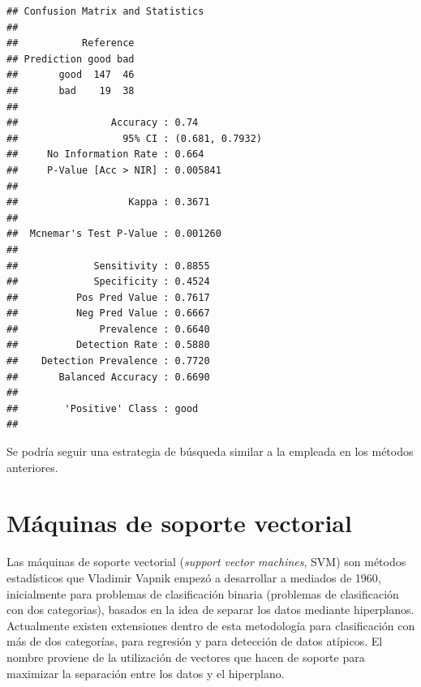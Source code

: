 \documentclass[
]{book}
\newenvironment{Shaded}{\begin{snugshade}}{\end{snugshade}}
\newcommand{\AttributeTok}[1]{\textcolor[rgb]{0.77,0.63,0.00}{#1}}
\newcommand{\FunctionTok}[1]{\textcolor[rgb]{0.00,0.00,0.00}{#1}}
\newcommand{\NormalTok}[1]{#1}
\newcommand{\SpecialCharTok}[1]{\textcolor[rgb]{0.00,0.00,0.00}{#1}}
\theoremstyle{break}
\theoremstyle{definition}
\theoremstyle{definition}
\theoremstyle{definition}
\theoremstyle{definition}
\theoremstyle{remark}
\begin{document}
\begin{Shaded}
\end{Shaded}

\begin{verbatim}
## Confusion Matrix and Statistics
## 
##           Reference
## Prediction good bad
##       good  147  46
##       bad    19  38
##                                          
##                Accuracy : 0.74           
##                  95% CI : (0.681, 0.7932)
##     No Information Rate : 0.664          
##     P-Value [Acc > NIR] : 0.005841       
##                                          
##                   Kappa : 0.3671         
##                                          
##  Mcnemar's Test P-Value : 0.001260       
##                                          
##             Sensitivity : 0.8855         
##             Specificity : 0.4524         
##          Pos Pred Value : 0.7617         
##          Neg Pred Value : 0.6667         
##              Prevalence : 0.6640         
##          Detection Rate : 0.5880         
##    Detection Prevalence : 0.7720         
##       Balanced Accuracy : 0.6690         
##                                          
##        'Positive' Class : good           
## 
\end{verbatim}

Se podría seguir una estrategia de búsqueda similar a la empleada en los métodos anteriores.

\hypertarget{svm}{%
\chapter{Máquinas de soporte vectorial}\label{svm}}

Las máquinas de soporte vectorial (\emph{support vector machines}, SVM) son métodos estadísticos que Vladimir Vapnik empezó a desarrollar a mediados de 1960, inicialmente para problemas de clasificación binaria (problemas de clasificación con dos categorias), basados en la idea de separar los datos mediante hiperplanos. Actualmente existen extensiones dentro de esta metodología para clasificación con más de dos categorías, para regresión y para detección de datos atípicos. El nombre proviene de la utilización de vectores que hacen de soporte para maximizar la separación entre los datos y el hiperplano.
\end{document}
